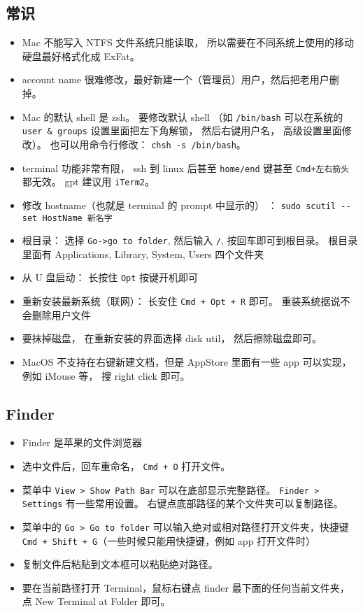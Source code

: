 \subsection{常识}
\begin{itemize}
\item Mac 不能写入 NTFS 文件系统只能读取， 所以需要在不同系统上使用的移动硬盘最好格式化成 ExFat。
\item account name 很难修改，最好新建一个（管理员）用户，然后把老用户删掉。
\item Mac 的默认 shell 是 zsh。 要修改默认 shell （如 \verb|/bin/bash| 可以在系统的 \verb|user & groups| 设置里面把左下角解锁， 然后右键用户名， 高级设置里面修改）。 也可以用命令行修改： \verb|chsh -s /bin/bash|。
\item terminal 功能非常有限， ssh 到 linux 后甚至 \verb|home/end| 键甚至 \verb|Cmd+左右箭头| 都无效。 gpt 建议用 \verb|iTerm2|。
\item 修改 hostname（也就是 terminal 的 prompt 中显示的） ： \verb|sudo scutil --set HostName 新名字|
\item 根目录： 选择 \verb|Go->go to folder|, 然后输入 \verb|/|, 按回车即可到根目录。 根目录里面有 Applications, Library, System, Users 四个文件夹
\item 从 U 盘启动： 长按住 \verb`Opt` 按键开机即可
\item 重新安装最新系统（联网）： 长安住 \verb|Cmd + Opt + R| 即可。 重装系统据说不会删除用户文件
\item 要抹掉磁盘， 在重新安装的界面选择 disk util， 然后擦除磁盘即可。
\item MacOS 不支持在右键新建文档，但是 AppStore 里面有一些 app 可以实现， 例如 iMouse 等， 搜 right click 即可。
\end{itemize}

\subsection{Finder}
\begin{itemize}
\item Finder 是苹果的文件浏览器
\item 选中文件后，回车重命名， \verb`Cmd + O` 打开文件。
\item 菜单中 \verb|View > Show Path Bar| 可以在底部显示完整路径。 \verb`Finder > Settings` 有一些常用设置。 右键点底部路径的某个文件夹可以复制路径。
\item 菜单中的 \verb`Go > Go to folder` 可以输入绝对或相对路径打开文件夹，快捷键 \verb`Cmd + Shift + G`（一些时候只能用快捷键，例如 app 打开文件时）
\item 复制文件后粘贴到文本框可以粘贴绝对路径。
\item 要在当前路径打开 Terminal，鼠标右键点 finder 最下面的任何当前文件夹，点 New Terminal at Folder 即可。
\end{itemize}

